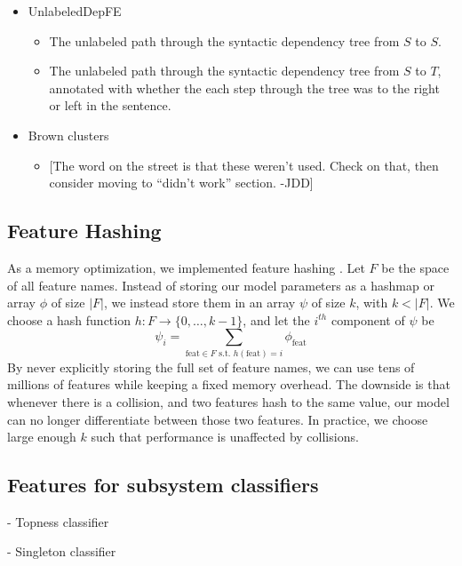 \documentclass[11pt]{article}
\newcommand{\jdcomment}[1]{\textcolor{NavyBlue}{[#1 -JDD]}}
\begin{document}
\begin{itemize}
\begin{itemize}
\end{itemize}
\item UnlabeledDepFE
\begin{itemize}
\item The unlabeled path through the syntactic dependency tree from $S$ to $S$. 
\item The unlabeled path through the syntactic dependency tree from $S$ to $T$, annotated with whether the each step through the tree was to the right or left in the sentence.
\end{itemize}
\item Brown clusters
\begin{itemize}
\item \jdcomment{The word on the street is that these weren't used. Check on that, then consider moving to ``didn't work'' section.}
\end{itemize}
\end{itemize}



\subsection{Feature Hashing}

As a memory optimization, we implemented feature hashing
\cite{weinberger_feature_2009}.
Let $F$ be the space of all feature names.
Instead of storing our model parameters as a hashmap %
or array $\phi$ of size $|F|$, we instead store them in an array $\psi$ of size
$k$, with $k < |F|$.
We choose a hash function $h : F \rightarrow \{0, \ldots, k-1\}$, and
let the $i^{th}$ component of $\psi$ be 
\[
\psi_i = \sum_{\text{feat}\in F \text{ s.t. }
h(\text{feat})=i}{\phi_{\text{feat}}}
\]
By never explicitly storing the full set of feature names, we can use
tens of millions of features while keeping a fixed memory overhead.
The downside is that whenever there is a collision, and two features hash to the
same value, our model can no longer differentiate between those two features.
In practice, we choose large enough $k$ such that performance is unaffected by
collisions.

\subsection{Features for subsystem classifiers}

 - Topness classifier

 - Singleton classifier
\end{document}
